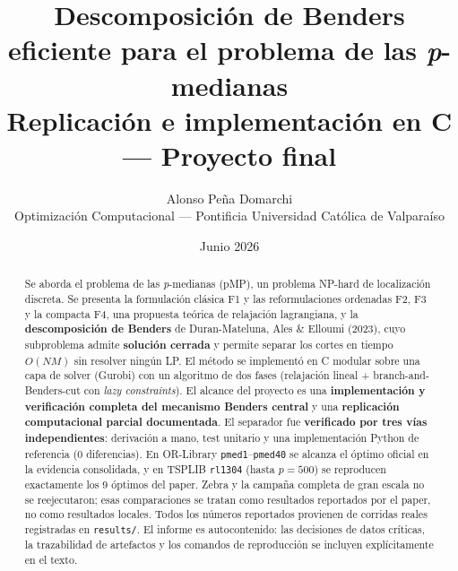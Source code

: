 \documentclass[11pt,a4paper]{article}
\title{\textbf{Descomposición de Benders eficiente para el problema de las \textit{p}-medianas}\\[4pt]
\large Replicación e implementación en C — Proyecto final}
\author{Alonso Peña Domarchi\\\small Optimización Computacional — Pontificia Universidad Católica de Valparaíso}
\date{Junio 2026}
\theoremstyle{remark}
\begin{document}
\maketitle

\begin{abstract}
\noindent
Se aborda el problema de las \textit{p}-medianas (pMP), un problema NP-hard de localización
discreta. Se presenta la formulación clásica F1 y las reformulaciones ordenadas F2, F3 y la
compacta F4, una propuesta teórica de relajación lagrangiana, y la \textbf{descomposición de
Benders} de Duran-Mateluna, Ales \& Elloumi (2023), cuyo subproblema admite \textbf{solución
cerrada} y permite separar los cortes en tiempo $O(NM)$ sin resolver ningún LP. El método se
implementó en C modular sobre una capa de solver (Gurobi) con un algoritmo de dos fases
(relajación lineal + branch-and-Benders-cut con \textit{lazy constraints}). El alcance del
proyecto es una \textbf{implementación y verificación completa del mecanismo Benders central} y
una \textbf{replicación computacional parcial documentada}. El separador fue \textbf{verificado por
tres vías independientes}: derivación a mano, test unitario y una implementación Python de referencia (0
diferencias). En OR-Library \texttt{pmed1}--\texttt{pmed40} se alcanza el óptimo oficial en la
evidencia consolidada, y en TSPLIB \texttt{rl1304} (hasta $p=500$) se reproducen exactamente los
9 óptimos del paper.
Zebra y la campaña completa de gran escala no se reejecutaron; esas comparaciones se tratan como
resultados reportados por el paper, no como resultados locales. Todos los números reportados
provienen de corridas reales registradas en \texttt{results/}. El informe es autocontenido: las
decisiones de datos críticas, la trazabilidad de artefactos y los comandos de reproducción se
incluyen explícitamente en el texto.
\end{abstract}

\tableofcontents
\bigskip













\end{document}
